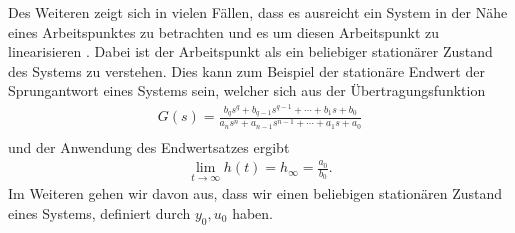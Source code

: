 %
%
Des Weiteren zeigt sich in vielen Fällen, dass es ausreicht ein System in der Nähe eines Arbeitspunktes zu betrachten und es um diesen Arbeitspunkt zu linearisieren \cite{Lunze10,MSF05}. Dabei ist der Arbeitspunkt als ein beliebiger stationärer Zustand des Systems zu verstehen. Dies kann zum Beispiel der stationäre Endwert der Sprungantwort eines Systems sein, welcher sich aus der Übertragungsfunktion
%
\begin{equation*}
\begin{aligned}
%
G(s)=\frac{b_{q}s^{q}+b_{q-1}s^{q-1}+\cdots+b_{1}s+b_{0}}{a_{n}s^{n}+a_{n-1}s^{n-1}+\cdots+a_{1}s+a_{0}}\\%
%
\end{aligned}
\end{equation*}
%
und der Anwendung des Endwertsatzes ergibt
%
\begin{equation*}
\begin{aligned}
%
\lim\limits_{t\rightarrow\infty }h(t)=h_{\infty}=\frac{a_{0}}{b_{0}}.
%
\end{aligned}
\end{equation*}
%
Im Weiteren gehen wir davon aus, dass wir einen beliebigen stationären Zustand eines Systems, definiert durch $y_{0},u_{0}$ haben.  
%

